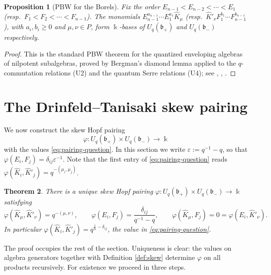 \documentclass[11pt]{amsart}
\newtheorem{theorem}{Theorem}[section]
\newtheorem{proposition}[theorem]{Proposition}
\theoremstyle{definition}
\newcommand{\BK}{\Bbbk}
\newcommand{\fb}{\mathfrak{b}}
\newcommand{\hK}{\hat K}
\begin{document}
\begin{proposition}[PBW for the Borels]\label{prop:PBW}
Fix the order $E_{n-1}<E_{n-2}<\cdots<E_1$ (resp.\ $F_1<F_2<\cdots<F_{n-1}$).
The monomials $E_{n-1}^{a_{n-1}}\cdots E_1^{a_1}\hK_\mu$ (resp.\
$\hK'_\nu F_1^{b_1}\cdots F_{n-1}^{b_{n-1}}$), with $a_i,b_i\ge0$ and
$\mu,\nu\in P$, form $\BK$-bases of $U_q(\fb_+)$ and $U_q(\fb_-)$
respectively.
\end{proposition}

\begin{proof}
This is the standard PBW theorem for the quantized enveloping algebras of
nilpotent subalgebras, proved by Bergman's diamond lemma \cite{Ber} applied to
the $q$-commutation relations (U2) and the quantum Serre relations (U4); see
\cite[Ch.~4]{Jan}, \cite{Lus}, \cite{KS}.
\end{proof}

\section{The Drinfeld--Tanisaki skew pairing}\label{sec:pairing}

We now construct the skew Hopf pairing
\[
\varphi:U_q(\fb_+)\times U_q(\fb_-)\longrightarrow\BK
\]
with the values \eqref{eq:pairing-question}. In this section we write
$\varepsilon:=q^{-1}-q$, so that $\varphi(E_i,F_j)=\delta_{ij}\varepsilon^{-1}$.
Note that the first entry of \eqref{eq:pairing-question} reads
$\varphi(\hK_i,\hK'_j)=q^{-(\mu_i,\mu_j)}$.

\begin{theorem}\label{thm:pairing}
There is a unique skew Hopf pairing
$\varphi:U_q(\fb_+)\times U_q(\fb_-)\to\BK$ satisfying
\begin{equation}\label{eq:pairing-values}
\varphi(\hK_\mu,\hK'_\nu)=q^{-(\mu,\nu)},\qquad
\varphi(E_i,F_j)=\frac{\delta_{ij}}{q^{-1}-q},\qquad
\varphi(\hK_\mu,F_j)=0=\varphi(E_i,\hK'_\nu).
\end{equation}
In particular $\varphi(\hK_i,\hK'_j)=q^{\frac1n-\delta_{ij}}$, the value in
\eqref{eq:pairing-question}.
\end{theorem}

The proof occupies the rest of the section. Uniqueness is clear: the values on
algebra generators together with Definition \ref{def:skew} determine $\varphi$ on
all products recursively. For existence we proceed in three steps.
\end{document}
